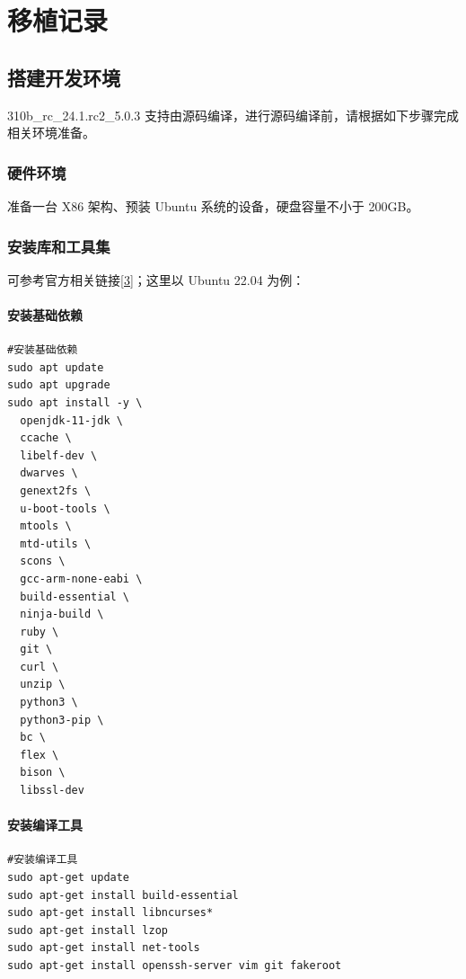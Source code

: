 
\chapter{移植记录}

\section{搭建开发环境}

310b\_rc\_24.1.rc2\_5.0.3 支持由源码编译，进行源码编译前，请根据如下步骤完成相关环境准备。

\subsection{硬件环境}

准备一台 X86 架构、预装 Ubuntu 系统的设备，硬盘容量不小于 200GB。

\subsection{安装库和工具集}

可参考官方相关链接\hyperref[ref:oh-build]{[3]}；这里以 Ubuntu 22.04 为例：

\subsubsection{安装基础依赖}

\begin{lstlisting}[style=shell, caption={安装基础依赖}]
#安装基础依赖
sudo apt update
sudo apt upgrade
sudo apt install -y \
  openjdk-11-jdk \
  ccache \
  libelf-dev \
  dwarves \
  genext2fs \
  u-boot-tools \
  mtools \
  mtd-utils \
  scons \
  gcc-arm-none-eabi \
  build-essential \
  ninja-build \
  ruby \
  git \
  curl \
  unzip \
  python3 \
  python3-pip \
  bc \
  flex \
  bison \
  libssl-dev
\end{lstlisting}

\subsubsection{安装编译工具}

\begin{lstlisting}[style=shell, caption={安装编译工具}]
#安装编译工具
sudo apt-get update
sudo apt-get install build-essential
sudo apt-get install libncurses*
sudo apt-get install lzop
sudo apt-get install net-tools
sudo apt-get install openssh-server vim git fakeroot
\end{lstlisting}

